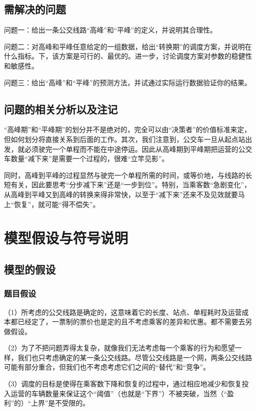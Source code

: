 \documentclass[UTF8]{ctexart}
\begin{document}
	\subsection{需解决的问题}
	问题一：给出一条公交线路“高峰”和“平峰”的定义，并说明其合理性。
	
	问题二：对高峰和平峰任意给定的一组数据，给出“转换期”的调度方案，并说明在什么指标。下，该方案是可行的、最优的。进一步，讨论调度方案对参数的稳健性和敏感性。
	
	问题三：给出“高峰”和“平峰”的预测方法，并试通过实际运行数据验证你的结果。
	\subsection{问题的相关分析以及注记}
	“高峰期”和“平峰期”的划分并不是绝对的，完全可以由“决策者”的价值标准来定，但如何划分将直接关系到后面的工作。其次，我们注意到，公交车一旦从起点站出发，就必须驶完一个单程而不能在中途停运。因此从高峰期到平峰期把运营的公交车数量“减下来”是需要一个过程的，很难“立竿见影”。
	
	同时，高峰到平峰的过程显然与驶完一个单程所需的时间，或等价地，与线路的长短有关，因此要思考“分步减下来”还是“一步到位”。特别，当乘客数“急剧变化”，从高峰到平峰又到高峰的转换来得非常快，以至于“减下来”还来不及见效就要马上“恢复”，就可能“得不偿失”。
	
	\section{模型假设与符号说明}
	\subsection{模型的假设}
	
	\subsubsection{题目假设}
	
	（1）所考虑的公交线路是确定的，这意味着它的长度、站点、单程耗时及运营成本都已经定了，一票制的票价也是定的且不考虑乘客的差异和优惠。都不需要去另做假设。
	
	（2）为了不把问题弄得太复杂，就像我们无法考虑每一个乘客的行为和愿望一样，我们也只考虑确定的某一条公交线路。尽管公交线路是一个网，两条公交线路可能有部分重合，但我们也不考虑考虑它们之间的“替代”和“竞争”。
	
	（3）调度的目标是使得在乘客数下降和恢复的过程中，通过相应地减少和恢复投入运营的车辆数量来保证这个“阈值”（也就是“下界”）不被突破，当然（“盈利”的）“上界”是不受限的。
	
\end{document}
